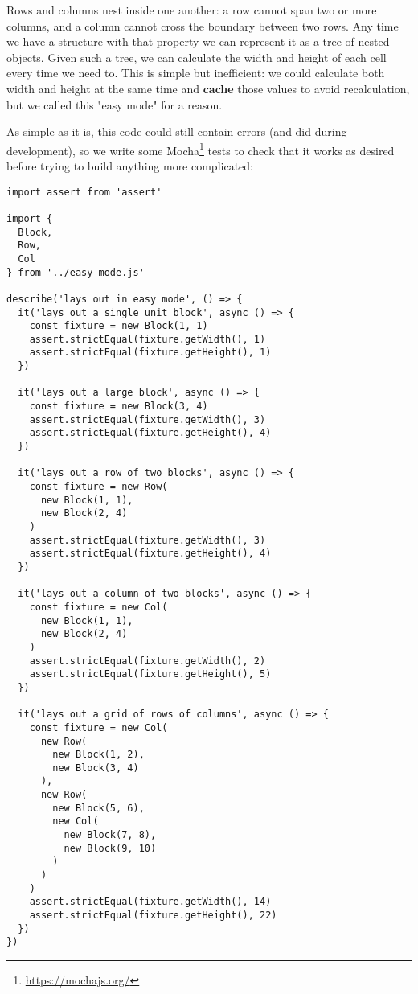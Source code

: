 \documentclass[krantzl]{krantz}
\newcommand{\glossref}[1]{\textbf{#1}}
\newcommand{\hreffoot}[2]{{#1}\footnote{\href{#2}{#2}}}
\begin{document}
Rows and columns nest inside one another:
a row cannot span two or more columns,
and a column cannot cross the boundary between two rows.
Any time we have a structure with that property
we can represent it as a tree of nested objects.
Given such a tree,
we can calculate the width and height of each cell every time we need to.
This is simple but inefficient:
we could calculate both width and height at the same time
and \glossref{cache} those values to avoid recalculation,
but we called this "easy mode" for a reason.


As simple as it is,
this code could still contain errors (and did during development),
so we write some \hreffoot{Mocha}{https://mochajs.org/} tests to check that it works as desired
before trying to build anything more complicated:


\begin{lstlisting}[frame=single,frameround=tttt]
import assert from 'assert'

import {
  Block,
  Row,
  Col
} from '../easy-mode.js'

describe('lays out in easy mode', () => {
  it('lays out a single unit block', async () => {
    const fixture = new Block(1, 1)
    assert.strictEqual(fixture.getWidth(), 1)
    assert.strictEqual(fixture.getHeight(), 1)
  })

  it('lays out a large block', async () => {
    const fixture = new Block(3, 4)
    assert.strictEqual(fixture.getWidth(), 3)
    assert.strictEqual(fixture.getHeight(), 4)
  })

  it('lays out a row of two blocks', async () => {
    const fixture = new Row(
      new Block(1, 1),
      new Block(2, 4)
    )
    assert.strictEqual(fixture.getWidth(), 3)
    assert.strictEqual(fixture.getHeight(), 4)
  })

  it('lays out a column of two blocks', async () => {
    const fixture = new Col(
      new Block(1, 1),
      new Block(2, 4)
    )
    assert.strictEqual(fixture.getWidth(), 2)
    assert.strictEqual(fixture.getHeight(), 5)
  })

  it('lays out a grid of rows of columns', async () => {
    const fixture = new Col(
      new Row(
        new Block(1, 2),
        new Block(3, 4)
      ),
      new Row(
        new Block(5, 6),
        new Col(
          new Block(7, 8),
          new Block(9, 10)
        )
      )
    )
    assert.strictEqual(fixture.getWidth(), 14)
    assert.strictEqual(fixture.getHeight(), 22)
  })
})
\end{lstlisting}
\end{document}
